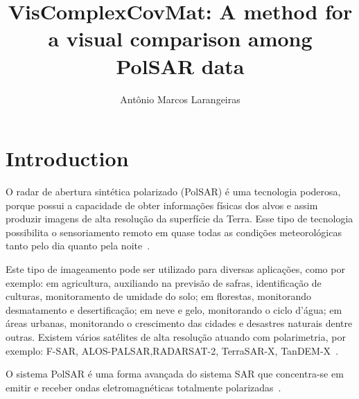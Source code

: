 \documentclass[a4paper,12pt]{article}
\title{VisComplexCovMat: A method for a visual comparison among Pol{SAR} data}
\author {Antônio Marcos Larangeiras }
\begin{document}
\maketitle

\begin{abstract}

\end{abstract}

\section{Introduction}

O radar de abertura sintética polarizado (PolSAR) é uma tecnologia poderosa, porque possui a capacidade de obter informações físicas dos alvos e assim produzir imagens de alta resolução da superfície da Terra. Esse tipo de tecnologia possibilita o sensoriamento remoto em quase todas as condições meteorológicas tanto pelo dia quanto pela noite~\citep{zhang-2015,liu-2015}.

Este tipo de imageamento pode ser utilizado para diversas apli\-ca\-ções, como por exemplo: em agricultura, auxiliando na previsão de safras, identificação de culturas, monitoramento de umidade do solo; em florestas, monitorando desmatamento e desertificação; em neve e gelo, monitorando o ciclo d'água; em áreas urbanas, monitorando o crescimento das cidades e desastres naturais dentre outras. Existem vários satélites de alta resolução atuando com polarimetria, por exemplo: F-SAR, ALOS-PALSAR,RADARSAT-2, TerraSAR-X, TanDEM-X~\citep{Meneses,Lee-2009,Chen-Liu-2013,Jagdhuber-2013,Chen-Si-Wei-2013,deledalle-2015,liu-2015,usami-2016}.

O sistema PolSAR é uma forma avançada do sistema SAR que concentra-se em emitir e receber ondas eletromagnéticas totalmente polarizadas~\citep{ma-2015}. 

\end{document}
